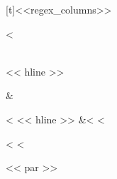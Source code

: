 \documentclass[letterpaper,10pt,english]{sphinxmanual}
\begin{document}
\begin{fulllineitems}
\begin{savenotes}
\begin{tabulary}{\linewidth}[t]{<<regex_columns>>}
\begin{varwidth}[t]{}
<%
\end{varwidth}%
\\
<< hline >>\begin{varwidth}[t]{}
\sphinxstyletheadfamily {}
\sphinxbeforeendvarwidth
\end{varwidth}%
&\begin{varwidth}[t]{}<%
<< hline >>\sphinxstyletheadfamily
{}
&<%
<%
\end{varwidth}%
<%
<%
\end{tabulary}
<< par >>
\sphinxattableend\end{savenotes}

\end{fulllineitems}

\end{document}
